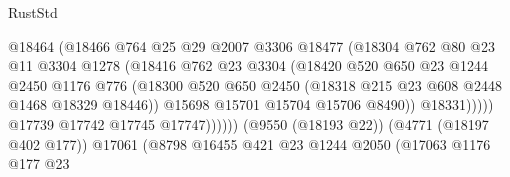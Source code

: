 \begin{lexlean}{RustStd}
\begin{coremodule}
                                        @18464
                                        (@18466
                                          @764
                                          @25
                                          @29
                                          @2007
                                          @3306
                                          @18477
                                          (@18304
                                            @762
                                            @80
                                            @23
                                            @11
                                            @3304
                                            @1278
                                            (@18416
                                              @762
                                              @23
                                              @3304
                                              (@18420
                                                @520
                                                @650
                                                @23
                                                @1244
                                                @2450
                                                @1176
                                                @776
                                                (@18300
                                                  @520
                                                  @650
                                                  @2450
                                                  (@18318 @215 @23 @608 @2448 @1468 @18329 @18446))
                                                @15698
                                                @15701
                                                @15704
                                                @15706
                                                @8490))
                                            @18331)))))
                                  @17739
                                  @17742
                                  @17745
                                  @17747))))))
                      (@9550 (@18193 @22))
                      (@4771 (@18197 @402 @177))
                      @17061
                      (@8798
                        @16455
                        @421
                        @23
                        @1244
                        @2050
                        (@17063
                          @1176
                          @177
                          @23

\end{coremodule}
\end{lexlean}
